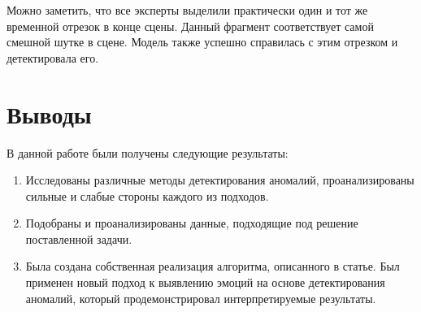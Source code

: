 \documentclass{article}
\begin{document}
Можно заметить, что все эксперты выделили практически один и тот же временной отрезок в конце сцены. Данный фрагмент соответствует самой смешной шутке в сцене. Модель также успешно справилась с этим отрезком и детектировала его.


\section{Выводы}
В данной работе были получены следующие результаты:
\begin{enumerate}
    \item Исследованы различные методы детектирования аномалий, проанализированы сильные и слабые стороны каждого из подходов.

    \item  Подобраны и проанализированы данные, подходящие под решение поставленной задачи.

    \item Была создана собственная реализация алгоритма, описанного в статье. Был применен новый подход к выявлению эмоций на основе детектирования аномалий, который продемонстрировал интерпретируемые результаты.
\end{enumerate}
    


\end{document}
